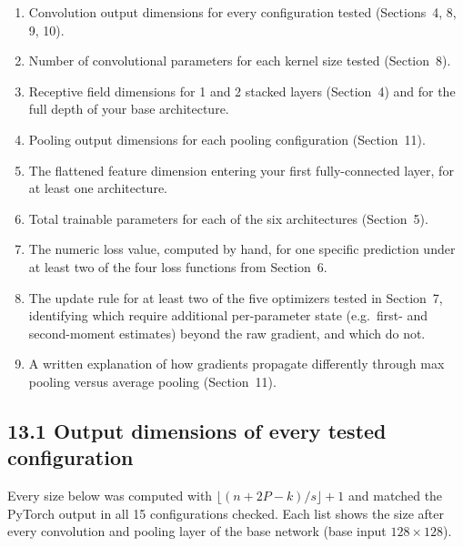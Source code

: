\documentclass[12pt,a4paper]{article}
\begin{document}
\begin{enumerate}[leftmargin=*, label=\arabic*.]
  \item Convolution output dimensions for every configuration tested (Sections~4, 8, 9, 10).
  \item Number of convolutional parameters for each kernel size tested (Section~8).
  \item Receptive field dimensions for 1 and 2 stacked layers (Section~4) and for the
        full depth of your base architecture.
  \item Pooling output dimensions for each pooling configuration (Section~11).
  \item The flattened feature dimension entering your first fully-connected layer,
        for at least one architecture.
  \item Total trainable parameters for each of the six architectures (Section~5).
  \item The numeric loss value, computed by hand, for one specific prediction under
        at least two of the four loss functions from Section~6.
  \item The update rule for at least two of the five optimizers tested in Section~7,
        identifying which require additional per-parameter state (e.g.\ first- and
        second-moment estimates) beyond the raw gradient, and which do not.
  \item A written explanation of how gradients propagate differently through max
        pooling versus average pooling (Section~11).
\end{enumerate}

\subsection*{13.1 Output dimensions of every tested configuration}

Every size below was computed with $\lfloor (n+2P-k)/s\rfloor+1$ and matched the PyTorch output in all 15 configurations checked.
Each list shows the size after every convolution and pooling layer of the base network
(base input $128\times128$).
\end{document}
